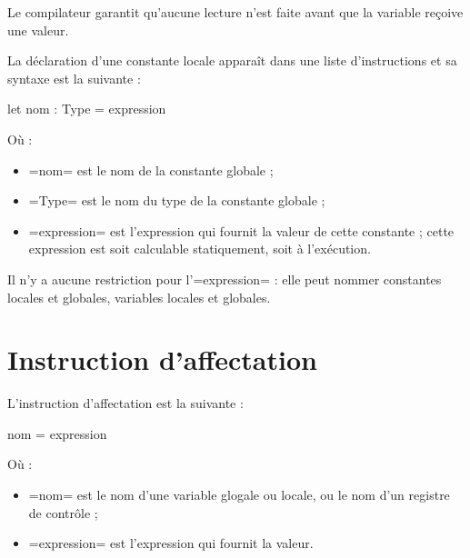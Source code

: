 Le compilateur garantit qu'aucune lecture n'est faite avant que la variable reçoive une valeur.











La déclaration d'une constante locale apparaît dans une liste d'instructions et sa syntaxe est la suivante :

\begin{PLM}
let nom : Type = expression
\end{PLM}

Où :
\begin{itemize}
  \item \plm=nom= est le nom de la constante globale ;
  \item \plm=Type= est le nom du type de la constante globale ;
  \item \plm=expression= est l'expression qui fournit la valeur de cette constante ; cette expression est soit calculable statiquement, soit à l'exécution.
\end{itemize}

Il n'y a aucune restriction pour l'\plm=expression= : elle peut nommer constantes locales et globales, variables locales et globales.






\section {Instruction d'affectation}

L'instruction d'affectation est la suivante :

\begin{PLM}
nom = expression
\end{PLM}

Où :
\begin{itemize}
  \item \plm=nom= est le nom d'une variable glogale ou locale, ou le nom d'un registre de contrôle ;
  \item \plm=expression= est l'expression qui fournit la valeur.
\end{itemize}











